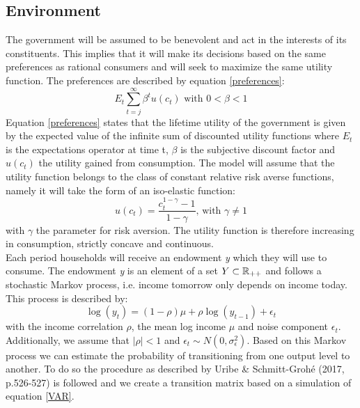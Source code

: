 \subsection{Environment}
The government will be assumed to be benevolent and act in the interests of its constituents. This implies that it will make its decisions based on the same preferences as rational consumers and will seek to maximize the same utility function. The preferences are described by equation \ref{preferences}:
\begin{equation}\label{preferences}
    E_t\sum_{t=j}^{\infty} \beta^t u(c_t) \mbox{ with } 0<\beta<1
\end{equation}
Equation \eqref{preferences} states that the lifetime utility of the government is given by the expected value of the infinite sum of discounted utility functions where $E_t$ is the expectations operator at time t, $\beta$ is the subjective discount factor and $u(c_t)$ the utility gained from consumption. The model will assume that the utility function belongs to the class of constant relative risk averse functions, namely it will take the form of an iso-elastic function:\\
\begin{equation*}
    u(c_t)=\frac{c_t^{1-\gamma}-1}{1-\gamma} \mbox{, with }\gamma\neq1
\end{equation*}
with $\gamma$ the parameter for risk aversion. The utility function is therefore increasing in consumption, strictly concave and continuous.\\

Each period households will receive an endowment \textit{y} which they will use to consume. The endowment \textit{y} is an element of a set  $Y \subset \mathbb{R}_{++}$ and follows a stochastic Markov process, i.e. income tomorrow only depends on income today. This process is described by:
\begin{equation}\label{VAR}
    \log(y_t) = (1-\rho)\mu + \rho \log(y_{t-1}) + \epsilon_t
\end{equation}
with the income correlation $\rho$, the mean log income $\mu$ and noise component $\epsilon_t$. Additionally, we assume that $|\rho|<1$ and $\epsilon_t\sim N(0,\sigma_{\epsilon}^{2})$. Based on this Markov process we can estimate the probability of transitioning from one output level to another. To do so the procedure as described by Uribe \& Schmitt-Grohé (2017, p.526-527) is followed and we create a transition matrix based on a simulation of equation \eqref{VAR}.\\

